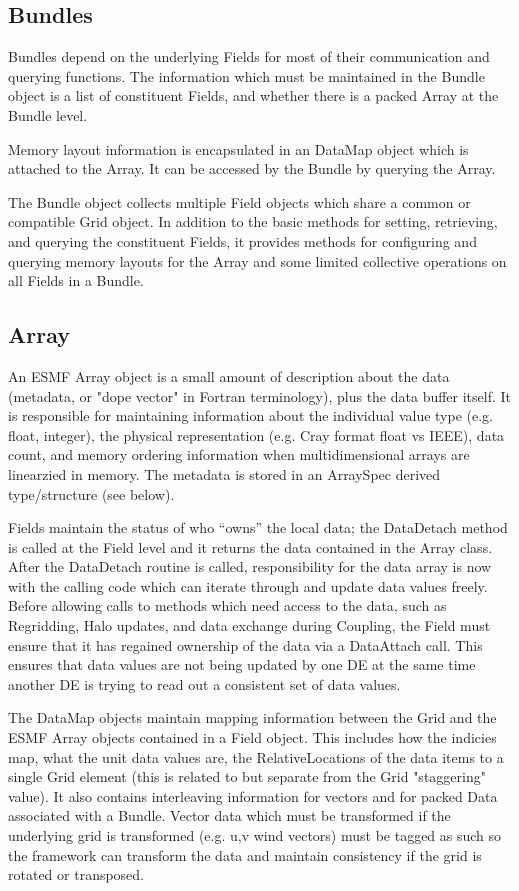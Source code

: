 \subsection{Bundles}

Bundles depend on the underlying Fields for most of their 
communication and querying functions.  The information which
must be maintained in the Bundle object is a list of constituent
Fields, and whether there is a packed Array at the Bundle level.

Memory layout information is encapsulated in an DataMap object which
is attached to the Array.  It can be accessed by the Bundle
by querying the Array.

The Bundle object collects multiple Field objects which share a
common or compatible Grid object.  In addition to the basic methods for
setting, retrieving, and querying the constituent Fields, it provides
methods for configuring and querying memory layouts for the Array
and some limited collective operations on all Fields in a Bundle.

\subsection{Array}

An ESMF Array object is a small amount of description about
the data (metadata, or "dope vector" in Fortran terminology), 
plus the data buffer itself.  It is 
responsible for maintaining
information about the individual value type (e.g. float, integer), 
the physical representation (e.g. Cray format float vs IEEE), 
data count, and memory ordering information when multidimensional
arrays are linearzied in memory.
The metadata is stored in an ArraySpec
derived type/structure (see below).

Fields maintain the status of who ``owns'' the local data;
the DataDetach method is called at the Field level and it
returns the data contained in the Array class.
After the DataDetach routine is called, responsibility for
the data array is now with the calling code which can iterate through
and update data values freely.  Before allowing calls to methods which need
access to the data, such as Regridding, Halo updates, and
data exchange during Coupling, the Field must ensure that it
has regained ownership of the data via a DataAttach call.  
This ensures that data values are not being updated by one
DE at the same time another DE is trying to read out a consistent
set of data values.


The DataMap objects maintain mapping information between the
Grid and the ESMF Array objects contained in a Field object.
This includes how the indicies map, what the unit data values are,
the RelativeLocations of the data items to a single Grid element
(this is related to but separate from the Grid "staggering" value).
It also contains interleaving information for vectors and for
packed Data associated with a Bundle.
Vector data which must be transformed if the underlying grid
is transformed (e.g. u,v wind vectors) must be tagged as such
so the framework can transform the data and maintain consistency
if the grid is rotated or transposed.

